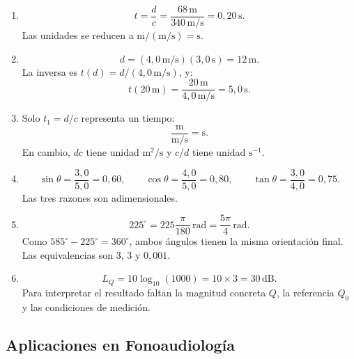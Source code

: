 \begin{enumerate}[label=\textbf{NA\arabic*.},leftmargin=*]
    \item
    \[
        t=\frac{d}{c}
        =\frac{68\,\text{m}}{340\,\text{m}/\text{s}}
        =0{,}20\,\text{s}.
    \]
    Las unidades se reducen a \(\text{m}/(\text{m}/\text{s})=\text{s}\).

    \item
    \[
        d=(4{,}0\,\text{m}/\text{s})(3{,}0\,\text{s})=12\,\text{m}.
    \]
    La inversa es \(t(d)=d/(4{,}0\,\text{m}/\text{s})\), y:
    \[
        t(20\,\text{m})
        =\frac{20\,\text{m}}{4{,}0\,\text{m}/\text{s}}
        =5{,}0\,\text{s}.
    \]

    \item Solo \(t_1=d/c\) representa un tiempo:
    \[
        \frac{\text{m}}{\text{m}/\text{s}}=\text{s}.
    \]
    En cambio, \(dc\) tiene unidad \(\text{m}^{2}/\text{s}\) y \(c/d\) tiene unidad \(\text{s}^{-1}\).

    \item
    \[
        \sin\theta=\frac{3{,}0}{5{,}0}=0{,}60,
        \qquad
        \cos\theta=\frac{4{,}0}{5{,}0}=0{,}80,
        \qquad
        \tan\theta=\frac{3{,}0}{4{,}0}=0{,}75.
    \]
    Las tres razones son adimensionales.

    \item
    \[
        225^{\circ}
        =225\frac{\pi}{180}\,\text{rad}
        =\frac{5\pi}{4}\,\text{rad}.
    \]
    Como \(585^{\circ}-225^{\circ}=360^{\circ}\), ambos ángulos tienen la misma orientación final. Las equivalencias son \(3\), \(3\) y \(0{,}001\).

    \item
    \[
        L_Q=10\log_{10}(1000)=10\times3=30\,\text{dB}.
    \]
    Para interpretar el resultado faltan la magnitud concreta \(Q\), la referencia \(Q_0\) y las condiciones de medición.
\end{enumerate}

\subsection*{Aplicaciones en Fonoaudiología}

